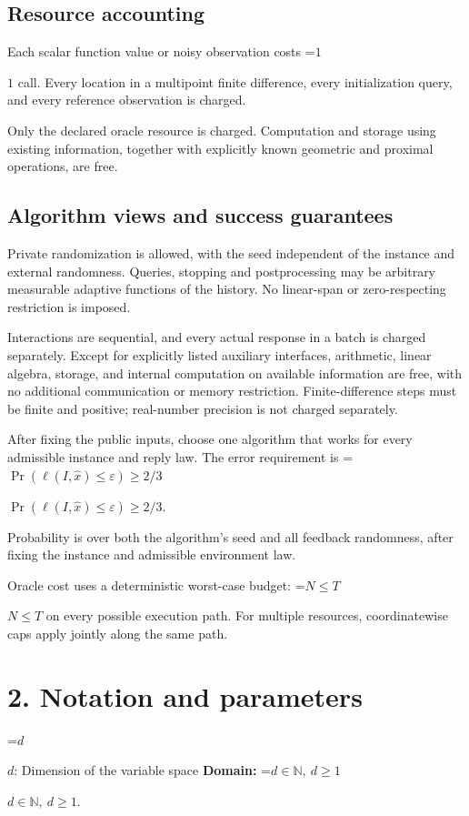\documentclass[10pt,a4paper]{article}
\newcommand{\AtlasMath}[1]{\par\begingroup\centering\setbox0=\hbox{$\displaystyle #1$}\ifdim\wd0>1.4\linewidth\typeout{ATLAS WIDE FORMULA: \the\wd0}\fi\ifdim\wd0>\linewidth\resizebox{\linewidth}{!}{\box0}\else\box0\fi\par\endgroup}
\newcommand{\AtlasInlineMath}[1]{\begingroup\setbox0=\hbox{$#1$}\ifdim\wd0>.4\linewidth\endgroup\AtlasMath{#1}\else\endgroup$#1$\fi}
\begin{document}
\subsection{Resource accounting}
Each scalar function value or noisy observation costs \AtlasInlineMath{1} call. Every location in a multipoint finite difference, every initialization query, and every reference observation is charged.

Only the declared oracle resource is charged. Computation and storage using existing information, together with explicitly known geometric and proximal operations, are free.

\subsection{Algorithm views and success guarantees}
Private randomization is allowed, with the seed independent of the instance and external randomness. Queries, stopping and postprocessing may be arbitrary measurable adaptive functions of the history. No linear-span or zero-respecting restriction is imposed.

Interactions are sequential, and every actual response in a batch is charged separately. Except for explicitly listed auxiliary interfaces, arithmetic, linear algebra, storage, and internal computation on available information are free, with no additional communication or memory restriction. Finite-difference steps must be finite and positive; real-number precision is not charged separately.

After fixing the public inputs, choose one algorithm that works for every admissible instance and reply law. The error requirement is \AtlasInlineMath{\Pr(\ell(I,\widehat{x})\le \varepsilon)\ge2/3}.

Probability is over both the algorithm's seed and all feedback randomness, after fixing the instance and admissible environment law.

Oracle cost uses a deterministic worst-case budget: \AtlasInlineMath{N\le T} on every possible execution path. For multiple resources, coordinatewise caps apply jointly along the same path.

\section{2. Notation and parameters}
\AtlasInlineMath{d}: Dimension of the variable space \textbf{Domain:} \AtlasInlineMath{d\in\mathbb{N},\ d\ge1}.
\end{document}
